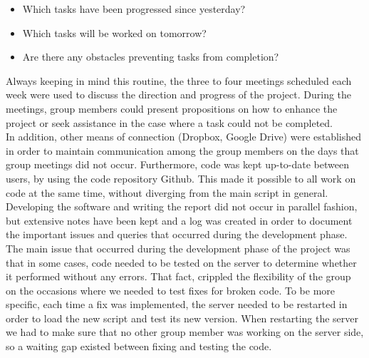 \begin{itemize}
\item Which tasks have been progressed since yesterday?
\item Which tasks will be worked on tomorrow?
\item Are there any obstacles preventing tasks from completion?
\end{itemize}

Always keeping in mind this routine, the three to four meetings scheduled each week were used to discuss the direction and progress of the project. 
During the meetings, group members could present propositions on how to enhance the project or seek assistance in the case where a task could not be completed. \\
In addition, other means of connection (Dropbox, Google Drive) were established in order to maintain communication among the group members on the days that group meetings did not occur. Furthermore, code was kept up-to-date between users, by using the code repository Github. This made it possible to all work on code at the same time, without diverging from the main script in general. \\
Developing the software and writing the report did not occur in parallel fashion, but extensive notes have been kept and a log was created in order to document the important issues and queries that occurred during the development phase. \\

The main issue that occurred during the development phase of the project was that in some cases, code needed to be tested on the server to determine whether it performed without any errors. That fact, crippled the flexibility of the group on the occasions where we needed to test fixes for broken code. To be more specific, each time a fix was implemented, the server needed to be restarted in order to load the new script and test its new version. When restarting the server we had to make sure that no other group member was working on the server side, so a waiting gap existed between fixing and testing the code.\\

